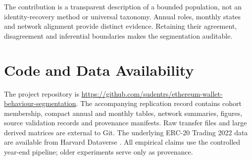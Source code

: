 The contribution is a transparent description of a bounded population, not an identity-recovery method or universal taxonomy. Annual roles, monthly states and network alignment provide distinct evidence. Retaining their agreement, disagreement and inferential boundaries makes the segmentation auditable.

\section*{Code and Data Availability}
The project repository is \url{https://github.com/sudentrs/ethereum-wallet-behaviour-segmentation}. The accompanying replication record contains cohort membership, compact annual and monthly tables, network summaries, figures, source validation records and provenance manifests. Raw transfer files and large derived matrices are external to Git. The underlying ERC-20 Trading 2022 data are available from Harvard Dataverse \cite{somin2025erc2022,somin2025dataset}. All empirical claims use the controlled year-end pipeline; older experiments serve only as provenance.

